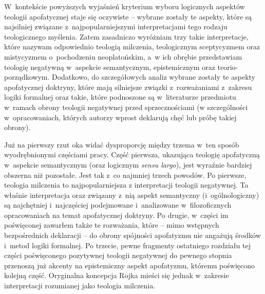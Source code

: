 W~kontekście powyższych wyjaśnień kryterium wyboru logicznych aspektów teologii apofatycznej staje się oczywiste -- wybrane zostały te aspekty, które są najsilniej związane z~najpopularniejszymi interpretacjami tego rodzaju teologicznego myślenia. Zatem zasadniczo wyróżniam trzy takie interpretacje, które nazywam odpowiednio teologią milczenia, teologicznym sceptycyzmem oraz mistycyzmem o~pochodzeniu neoplatońskim, a~w ich obrębie przedstawiam teologię negatywną w~aspekcie semantycznym, epistemicznym oraz teorio-porządkowym. Dodatkowo, do szczegółowych analiz wybrane zostały te aspekty apofatycznej doktryny, które mają silniejsze związki z~rozważaniami z~zakresu logiki formalnej oraz takie, które podnoszone są w~literaturze przedmiotu w~ramach obrony teologii negatywnej przed sprzecznościami (w szczególności w~opracowaniach, których autorzy wprost deklarują chęć lub próbę takiej obrony).

Już na pierwszy rzut oka widać dysproporcję między trzema w~ten sposób wyodrębnionymi częściami pracy. Część pierwsza, ukazująca teologię apofatyczną w~aspekcie semantycznym (oraz logicznym \textit{sensu largo}), jest wyraźnie bardziej obszerna niż pozostałe. Jest tak z~co najmniej trzech powodów. Po pierwsze,
teologia milczenia to najpopularniejsza z interpretacji teologii negatywnej.
Ta właśnie interpretacja oraz związany z~nią aspekt semantyczny (i~ogólnologiczny) są najchętniej i~najczęściej podejmowane i~analizowane w~filozoficznych opracowaniach na temat apofatycznej doktryny. Po drugie, w~części im poświęconej zawarłem także te rozważania, które -- mimo wstępnych bezpośrednich deklaracji -- do obrony spójności apofatyzmu nie angażują środków i~metod logiki formalnej. Po trzecie, pewne fragmenty ostatniego rozdziału tej części poświęconego pozytywnej teologii negatywnej do pewnego stopnia przenoszą już akcenty na epistemiczny aspekt apofatyzmu, któremu poświęcono kolejną część. Oryginalna koncepcja Rojka mieści się jednak w~zakresie interpretacji rozumianej jako teologia milczenia.

